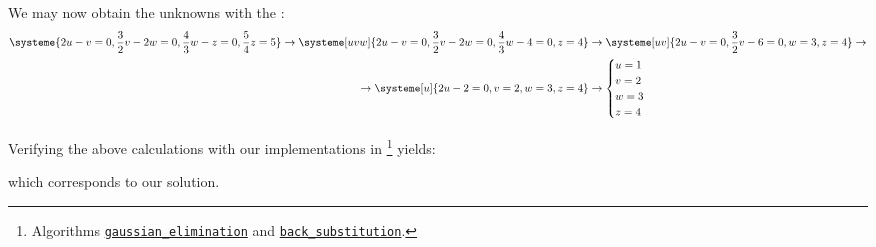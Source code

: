 We may now obtain the unknowns with the :
\begin{equation*}
  \begin{split}
    \systeme{2u-v=0,\frac{3}{2}v-2w=0,\frac{4}{3}w-z=0,\frac{5}{4}z=5}
    \rightarrow
    \systeme[uvw]{2u-v=0,\frac{3}{2}v-2w=0,\frac{4}{3}w-4=0,z=4}
    &\rightarrow
    \systeme[uv]{2u-v=0,\frac{3}{2}v-6=0,w=3,z=4}
    \rightarrow\\
    \rightarrow
    \systeme[u]{2u-2=0,v=2,w=3,z=4}
    &\rightarrow
    \begin{cases}
    u=1\\
    v=2\\
    w=3\\
    z=4
    \end{cases}
\end{split}
\end{equation*}

Verifying the above calculations with our implementations in \MATLAB
\footnote{Algorithms \hyperref[algorithm:gaussian_elimination]{\texttt{gaussian\_elimination}} and \hyperref[algorithm:back_substitution]{\texttt{back\_substitution}}.}
yields:

which corresponds to our solution.
